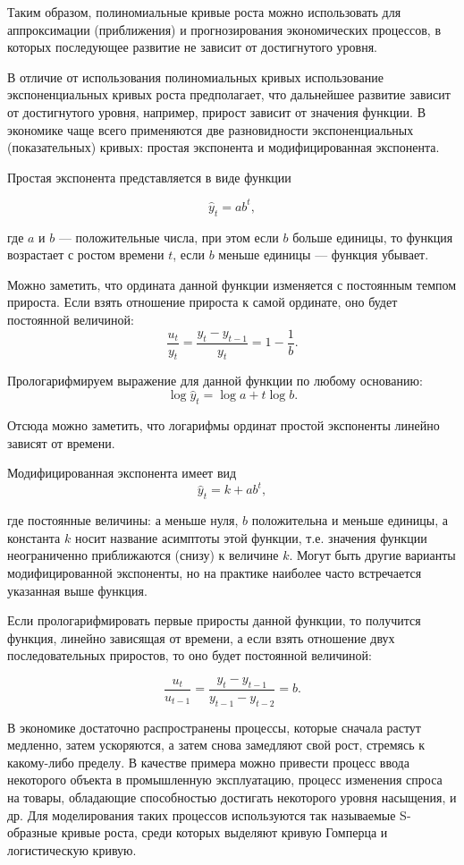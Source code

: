 Таким образом, полиномиальные кривые роста можно использовать для аппроксимации (приближения) и прогнозирования экономических процессов, в которых последующее развитие не зависит от достигнутого уровня.

В отличие от использования полиномиальных кривых использование экспоненциальных кривых роста предполагает, что дальнейшее развитие зависит от достигнутого уровня, например, прирост зависит от значения функции. В экономике чаще всего применяются две разновидности экспоненциальных (показательных) кривых: простая экспонента и модифицированная экспонента.

Простая экспонента представляется в виде функции

\[\hat{y}_t=ab^t, \]

где $a$ и $b$ --- положительные числа, при этом если $b$ больше единицы, то функция возрастает с ростом времени $t$, если $b$ меньше единицы --- функция убывает.

Можно заметить, что ордината данной функции изменяется с постоянным темпом прироста. Если взять отношение прироста к самой ординате, оно будет постоянной величиной:
\[ \dfrac{u_t}{y_t} = \dfrac{y_t - y_{t-1}}{y_t} = 1 - \dfrac{1}{b}. \]

Прологарифмируем выражение для данной функции по любому основанию:
\[ \log \hat{y}_t = \log a + t \log b. \]

Отсюда можно заметить, что логарифмы ординат простой экспоненты линейно зависят от времени.

Модифицированная экспонента имеет вид
\[ \hat{y}_t = k + ab^t, \]

где постоянные величины: $а$ меньше нуля, $ b $ положительна и меньше единицы, а константа $ k $ носит название асимптоты этой функции, т.е. значения функции неограниченно приближаются (снизу) к величине $ k $. Могут быть другие варианты модифицированной экспоненты, но на практике наиболее часто встречается указанная выше функция.

Если прологарифмировать первые приросты данной функции, то получится функция, линейно зависящая от времени, а если взять отношение двух последовательных приростов, то оно будет постоянной величиной:

\[ \dfrac{u_t}{u_{t-1}} = \dfrac{y_t - y_{t-1}}{y_{t-1} - y_{t-2}} = b. \]

В экономике достаточно распространены процессы, которые сначала растут медленно, затем ускоряются, а затем снова замедляют свой рост, стремясь к какому-либо пределу. В качестве примера можно привести процесс ввода некоторого объекта в промышленную эксплуатацию, процесс изменения спроса на товары, обладающие способностью достигать некоторого уровня насыщения, и др. Для моделирования таких процессов используются так называемые S-образные кривые роста, среди которых выделяют кривую Гомперца и логистическую кривую.

